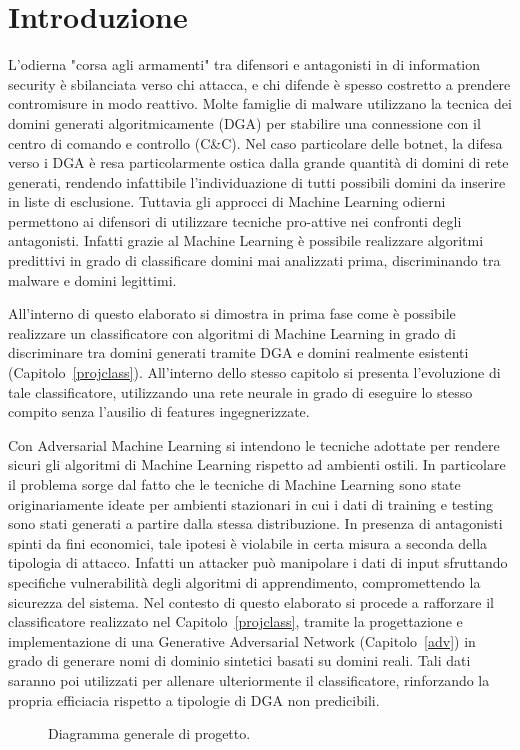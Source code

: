 \chapter{Introduzione}

L'odierna "corsa agli armamenti" tra difensori e antagonisti in di information security è sbilanciata verso chi attacca, e chi difende è spesso costretto a prendere contromisure in modo reattivo. Molte famiglie di malware utilizzano la tecnica dei domini generati algoritmicamente (DGA) per stabilire una connessione con il centro di comando e controllo (C\&C). Nel caso particolare delle botnet, la difesa verso i DGA è resa particolarmente ostica dalla grande quantità di domini di rete generati, rendendo infattibile l'individuazione di tutti possibili domini da inserire in liste di esclusione. Tuttavia gli approcci di Machine Learning odierni permettono ai difensori di utilizzare tecniche pro-attive nei confronti degli antagonisti. Infatti grazie al Machine Learning è possibile realizzare algoritmi predittivi in grado di classificare domini mai analizzati prima, discriminando tra malware e domini legittimi.

All'interno di questo elaborato si dimostra in prima fase come è possibile realizzare un classificatore con algoritmi di Machine Learning in grado di discriminare tra domini generati tramite DGA e domini realmente esistenti (Capitolo~\ref{projclass}). All'interno dello stesso capitolo si presenta l'evoluzione di tale classificatore, utilizzando una rete neurale in grado di eseguire lo stesso compito senza l'ausilio di features ingegnerizzate.

Con Adversarial Machine Learning si intendono le tecniche adottate per rendere sicuri gli algoritmi di Machine Learning rispetto ad ambienti ostili. In particolare il problema sorge dal fatto che le tecniche di Machine Learning sono state originariamente ideate per ambienti stazionari in cui i dati di training e testing sono stati generati a partire dalla stessa distribuzione. In presenza di antagonisti spinti da fini economici, tale ipotesi è violabile in certa misura a seconda della tipologia di attacco. Infatti un attacker può manipolare i dati di input sfruttando specifiche vulnerabilità degli algoritmi di apprendimento, compromettendo la sicurezza del sistema. Nel contesto di questo elaborato si procede a rafforzare il classificatore realizzato nel Capitolo~\ref{projclass}, tramite la progettazione e implementazione di una Generative Adversarial Network (Capitolo~\ref{adv}) in grado di generare nomi di dominio sintetici basati su domini reali. Tali dati saranno poi utilizzati per allenare ulteriormente il classificatore, rinforzando la propria efficiacia rispetto a tipologie di DGA non predicibili.

\begin{figure}[!bp]
    \centering
	
	\caption{Diagramma generale di progetto. \label{fig:intro}}
\end{figure}
